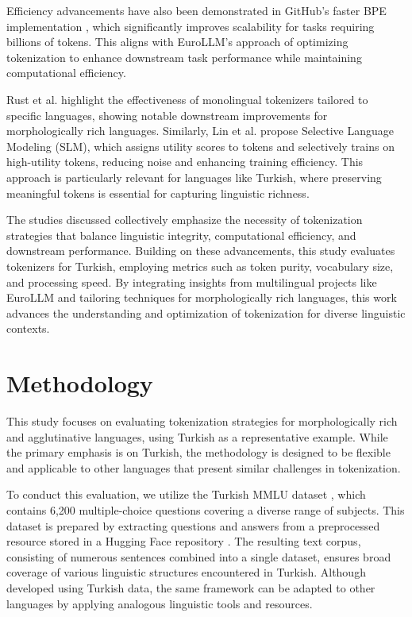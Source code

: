 \documentclass{article}
\begin{document}
  Efficiency advancements have also been demonstrated in GitHub's faster BPE implementation \cite{neubeck_so_2024}, which significantly improves scalability for tasks requiring billions of tokens. This aligns with EuroLLM’s approach of optimizing tokenization to enhance downstream task performance while maintaining computational efficiency.
  
  Rust et al. \cite{rust_how_2021} highlight the effectiveness of monolingual tokenizers tailored to specific languages, showing notable downstream improvements for morphologically rich languages. Similarly, Lin et al. \cite{lin_not_nodate} propose Selective Language Modeling (SLM), which assigns utility scores to tokens and selectively trains on high-utility tokens, reducing noise and enhancing training efficiency. This approach is particularly relevant for languages like Turkish, where preserving meaningful tokens is essential for capturing linguistic richness.
  
  The studies discussed collectively emphasize the necessity of tokenization strategies that balance linguistic integrity, computational efficiency, and downstream performance. Building on these advancements, this study evaluates tokenizers for Turkish, employing metrics such as token purity, vocabulary size, and processing speed. By integrating insights from multilingual projects like EuroLLM and tailoring techniques for morphologically rich languages, this work advances the understanding and optimization of tokenization for diverse linguistic contexts.
  \section{Methodology}

  This study focuses on evaluating tokenization strategies for morphologically rich and agglutinative languages, using Turkish as a representative example. While the primary emphasis is on Turkish, the methodology is designed to be flexible and applicable to other languages that present similar challenges in tokenization.
  
  To conduct this evaluation, we utilize the Turkish MMLU dataset \cite{bayram_turkish_nodate}, which contains 6,200 multiple-choice questions covering a diverse range of subjects. This dataset is prepared by extracting questions and answers from a preprocessed resource stored in a Hugging Face repository \cite{bayram_turkish_nodate}. The resulting text corpus, consisting of numerous sentences combined into a single dataset, ensures broad coverage of various linguistic structures encountered in Turkish. Although developed using Turkish data, the same framework can be adapted to other languages by applying analogous linguistic tools and resources.
  
\end{document}
